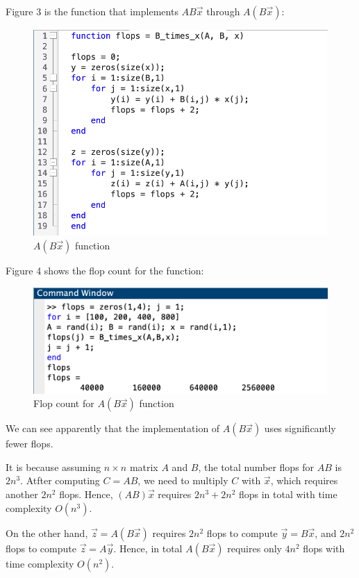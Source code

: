 \documentclass{article}
\begin{document}
Figure 3 is the function that implements $AB\vec{x}$ through $A(B\vec{x})$:
\begin{figure}[h]
    \centering
    \includegraphics[scale = 0.5]{B_times_x_function.png}
    \caption{$A(B\vec{x})$ function}
\end{figure}

Figure 4 shows the flop count for the function:
\begin{figure}[h]
    \centering
    \includegraphics[scale = 0.5]{B_times_x_flops.png}
    \caption{Flop count for $A(B\vec{x})$ function}
\end{figure}

We can see apparently that the implementation of $A(B\vec{x})$ uses significantly fewer flops.

It is because assuming $n \times n$ matrix $A$ and $B$, the total number flops for $AB$ is $2n^3$.
Atfter computing $C = AB$, we need to multiply $C$ with $\vec{x}$, which requires another $2n^2$ flops. 
Hence, $(AB)\vec{x}$ requires $2n^3 + 2n^2$ flops in total with time complexity $O(n^3)$.

On the other hand, $\vec{z} = A(B\vec{x})$ requires $2n^2$ flops to compute $\vec{y} = B\vec{x}$, and $2n^2$ flops to compute $\vec{z} = A\vec{y}$.
Hence, in total $A(B\vec{x})$ requires only $4n^2$ flops with time complexity $O(n^2)$.
\bigbreak
\end{document}
